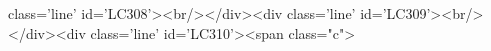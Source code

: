 class='line' id='LC308'><br/></div><div class='line' id='LC309'><br/></div><div class='line' id='LC310'><span class="c">%